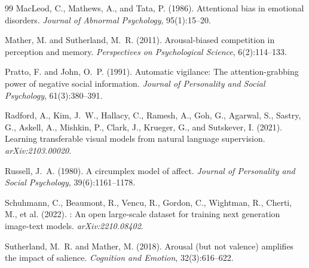 \documentclass[12pt]{article}
\begin{document}
\begin{thebibliography}{99}
MacLeod, C., Mathews, A., and Tata, P. (1986).
\newblock Attentional bias in emotional disorders.
\newblock \emph{Journal of Abnormal Psychology}, 95(1):15--20.

Mather, M. and Sutherland, M.~R. (2011).
\newblock Arousal-biased competition in perception and memory.
\newblock \emph{Perspectives on Psychological Science}, 6(2):114--133.

Pratto, F. and John, O.~P. (1991).
\newblock Automatic vigilance: The attention-grabbing power of negative social information.
\newblock \emph{Journal of Personality and Social Psychology}, 61(3):380--391.

Radford, A., Kim, J.~W., Hallacy, C., Ramesh, A., Goh, G., Agarwal, S., Sastry, G., Askell, A., Mishkin, P., Clark, J., Krueger, G., and Sutskever, I. (2021).
\newblock Learning transferable visual models from natural language supervision.
\newblock \emph{arXiv:2103.00020}.

Russell, J.~A. (1980).
\newblock A circumplex model of affect.
\newblock \emph{Journal of Personality and Social Psychology}, 39(6):1161--1178.

Schuhmann, C., Beaumont, R., Vencu, R., Gordon, C., Wightman, R., Cherti, M., et al. (2022).
: An open large-scale dataset for training next generation image-text models.
\newblock \emph{arXiv:2210.08402}.

Sutherland, M.~R. and Mather, M. (2018).
\newblock Arousal (but not valence) amplifies the impact of salience.
\newblock \emph{Cognition and Emotion}, 32(3):616--622.

\end{thebibliography}
\end{document}
